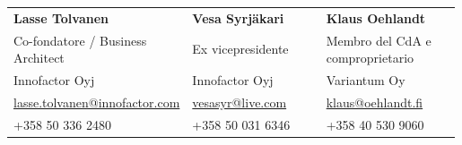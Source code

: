 \documentclass[10pt,a4paper]{article}
\begin{document}
\vspace{2pt}
\begin{tabular}{@{}p{0.33\linewidth}@{}p{0.33\linewidth}@{}p{0.33\linewidth}@{}}
\textbf{Lasse Tolvanen} & \textbf{Vesa Syrjäkari} & \textbf{Klaus Oehlandt} \\
Co-fondatore / Business Architect & Ex vicepresidente & Membro del CdA e comproprietario \\
Innofactor Oyj & Innofactor Oyj & Variantum Oy \\
\href{mailto:lasse.tolvanen@innofactor.com}{lasse.tolvanen@innofactor.com} & \href{mailto:vesasyr@live.com}{vesasyr@live.com} & \href{mailto:klaus@oehlandt.fi}{klaus@oehlandt.fi} \\
+358 50 336 2480 & +358 50 031 6346 & +358 40 530 9060 \\
\end{tabular}
\end{document}
